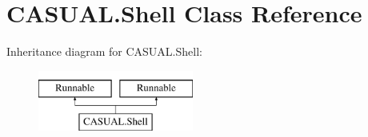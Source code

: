 \hypertarget{classCASUAL_1_1Shell}{\section{C\-A\-S\-U\-A\-L.\-Shell Class Reference}
\label{classCASUAL_1_1Shell}
}
Inheritance diagram for C\-A\-S\-U\-A\-L.\-Shell\-:\begin{figure}[H]
\begin{center}
\leavevmode
\includegraphics[height=2.000000cm]{classCASUAL_1_1Shell}
\end{center}
\end{figure}
